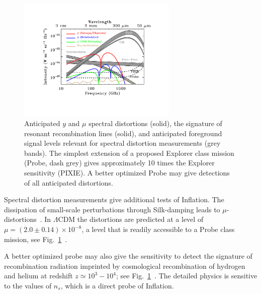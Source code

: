 \begin{figure}[ht!]
\hspace{-0.2in}
\parbox{4.0in}{\centerline {
\includegraphics[width=3.0in]{Figures/probe_spectral_foregrounds_v3.pdf} } }
\hspace{-0.05in}
\parbox{2.5in}{
\caption{ \small \setlength{\baselineskip}{0.95\baselineskip}
Anticipated $y$ and $\mu$ spectral distortions (solid), the signature of resonant recombination lines (solid), and anticipated foreground 
signal levels relevant for spectral distortion measurements (grey bands). 
The simplest extension of a proposed
Explorer class mission (Probe, dash grey) gives approximately 10 times the Explorer sensitivity (PIXIE). 
A better optimized Probe may give detections of all anticipated distortions. 
\label{fig:distortions} } }
\vspace{-0.1in}
\end{figure}

Spectral distortion measurements give additional tests of Inflation. The dissipation of small-scale 
perturbations through Silk-damping leads to $\mu$-distortions~\cite{Sunyaev1970diss, Daly1991, Hu1994, Chluba2012}. 
In $\Lambda$CDM the distortions are predicted at a level of $\mu=(2.0\pm0.14)\times 10^{-8}$, a level that 
is readily accessible to a Probe class mission, see Fig.~\ref{fig:distortions}~\cite{Chluba2012, Chluba2016LCDM}. 

A better optimized probe may also give the sensitivity to detect the signature of recombination 
radiation imprinted by cosmological recombination of hydrogen and helium 
at redshift $z\simeq 10^3-10^4$; see Fig.~\ref{fig:distortions}~\citep{Sunyaev2009, Chluba2016}. 
The detailed physics is sensitive to the values of $n_{s}$, which is a direct probe of Inflation. 



